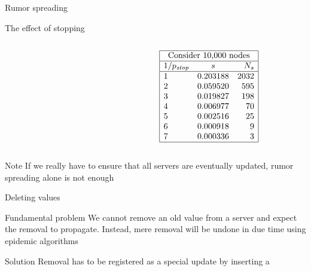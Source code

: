 \begin{slide}{Rumor spreading}
  \begin{block}{The effect of stopping}
    \begin{columns}
      \begin{column}{0.4\textwidth}
      \end{column}
      \begin{column}{0.4\textwidth}
        \newcommand{\pstop}{p_{\mbox{\scriptsize\itshape stop}}}
        \footnotesize
        \[
        \begin{array}{|lcr|} \hline
	      \multicolumn{3}{|c|}{\mbox{Consider 10,000 nodes}} \\ \hline
	      1/\pstop   &   s         & N_s \\ \hline
	      1          &   0.203188  & 2032 \\
	      2          &   0.059520  & 595 \\
	      3          &   0.019827  & 198 \\
	      4          &   0.006977  & 70 \\
	      5          &   0.002516  & 25 \\ 
	      6          &   0.000918  & 9 \\
	      7          &   0.000336  & 3 \\ \hline
	    \end{array}
        \]
      \end{column}
    \end{columns}
  \end{block}
  \begin{alertblock}{Note}
    If we really have to ensure that all servers are eventually updated, rumor spreading alone is not enough
  \end{alertblock}
\end{slide}
\begin{slide}{Deleting values}
  \begin{alertblock}{Fundamental problem} 
    We cannot remove an old value from a server and expect the removal to propagate. Instead, mere removal
    will be undone in due time using epidemic algorithms
  \end{alertblock}
  \begin{block}{Solution} 
    Removal has to be registered as a special update by inserting a 
  \end{block}
\end{slide}
